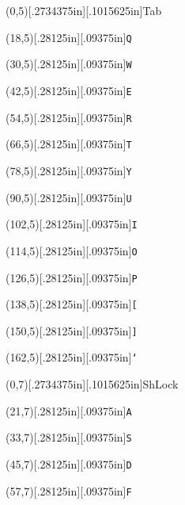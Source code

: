 \documentclass[12pt]{{memoir}}
\newcommand\keycaps[1]{\raisebox{0in}[.2734375in][.1015625in]{\tiny\textsf{#1}}}
\newcommand\keycapt[1]{\raisebox{0in}[.28125in][.09375in]{\texttt{#1}}}
\begin{document}
\begin{center}
\begin{textblock}{18}(0,5)\keycaps{Tab}\end{textblock}
\begin{textblock}{12}(18,5)\keycapt{Q}\end{textblock}
\begin{textblock}{12}(30,5)\keycapt{W}\end{textblock}
\begin{textblock}{12}(42,5)\keycapt{E}\end{textblock}
\begin{textblock}{12}(54,5)\keycapt{R}\end{textblock}
\begin{textblock}{12}(66,5)\keycapt{T}\end{textblock}
\begin{textblock}{12}(78,5)\keycapt{Y}\end{textblock}
\begin{textblock}{12}(90,5)\keycapt{U}\end{textblock}
\begin{textblock}{12}(102,5)\keycapt{I}\end{textblock}
\begin{textblock}{12}(114,5)\keycapt{O}\end{textblock}
\begin{textblock}{12}(126,5)\keycapt{P}\end{textblock}
\begin{textblock}{12}(138,5)\keycapt{[}\end{textblock}
\begin{textblock}{12}(150,5)\keycapt{]}\end{textblock}
\begin{textblock}{18}(162,5)\keycapt{\char`\\}\end{textblock}
\begin{textblock}{18}(0,7)\keycaps{ShLock}\end{textblock}
\begin{textblock}{12}(21,7)\keycapt{A}\end{textblock}
\begin{textblock}{12}(33,7)\keycapt{S}\end{textblock}
\begin{textblock}{12}(45,7)\keycapt{D}\end{textblock}
\begin{textblock}{12}(57,7)\keycapt{F}\end{textblock}

\end{center}
\end{document}
